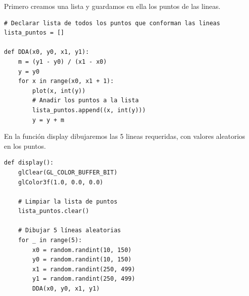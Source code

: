 \documentclass[a4paper]{article}
\begin{document}
Primero  creamos una lista y guardamos en ella los puntos de las lineas.
\begin{center}
\begin{mycodebox}
\begin{lstlisting}
# Declarar lista de todos los puntos que conforman las lineas
lista_puntos = []

def DDA(x0, y0, x1, y1):
    m = (y1 - y0) / (x1 - x0)
    y = y0
    for x in range(x0, x1 + 1):
        plot(x, int(y))
        # Anadir los puntos a la lista
        lista_puntos.append((x, int(y)))
        y = y + m
\end{lstlisting}
\end{mycodebox}
\end{center}
En la función display dibujaremos las 5 lineas requeridas, con valores aleatorios en los puntos.
\begin{center}
\begin{mycodebox}
\begin{lstlisting}
def display():
    glClear(GL_COLOR_BUFFER_BIT)
    glColor3f(1.0, 0.0, 0.0)

    # Limpiar la lista de puntos
    lista_puntos.clear()

    # Dibujar 5 líneas aleatorias
    for _ in range(5):
        x0 = random.randint(10, 150)
        y0 = random.randint(10, 150)
        x1 = random.randint(250, 499)
        y1 = random.randint(250, 499)
        DDA(x0, y0, x1, y1)
\end{lstlisting}
\end{mycodebox}
\end{center}
\end{document}
